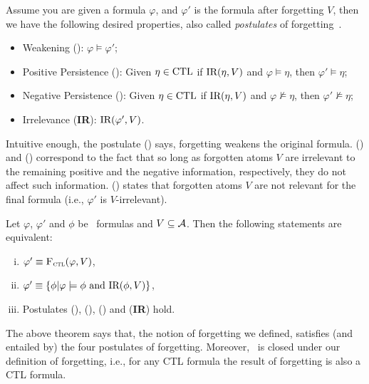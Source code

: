 \documentclass[letterpaper]{article} %
\begin{document}


Assume you are given a formula $\varphi$, and $\varphi'$ is the formula after forgetting $V$, then we have the following desired properties, also called {\em postulates} of forgetting~\cite{Yan:AIJ:2009}.
\begin{itemize}
  \item Weakening (\W): $\varphi \models \varphi'$;
  \item Positive Persistence (\PP):
  Given $\eta \in \textrm{CTL}$ if $\textrm{IR}(\eta, V)$ and $\varphi \models \eta$, then $\varphi' \models \eta$;
  \item Negative Persistence (\NgP):   Given $\eta \in \textrm{CTL}$  if $\textrm{IR}(\eta, V)$ and $\varphi \nvDash \eta$, then $\varphi' \nvDash \eta$;
  \item Irrelevance (\textbf{IR}): $\textrm{IR}(\varphi', V)$.
\end{itemize}


Intuitive enough, the postulate (\W) says, forgetting weakens the original formula.  (\PP)  and  (\NgP) correspond to the fact that so long as forgotten atoms $V$ are irrelevant to the remaining positive and the negative information, respectively, they do not affect such information. (\textbf{\IR}) states that forgotten atoms $V$ are not relevant for the final formula (i.e., $\varphi'$ is $V$-irrelevant).



\begin{theorem}\label{thm:close}
Let $\varphi$, $\varphi'$ and $\phi$ be \CTL\ formulas and $V \subseteq {\cal A}$.
Then the following statements are equivalent:
\begin{enumerate}[(i)]
  \item $\varphi' \equiv {\textsc{F}_{\textsc{ctl}}}(\varphi, V)$,
  \item $\varphi'\equiv \{\phi | \varphi \models \phi \text{ and } \textrm{IR}(\phi, V)\}$,
  \item Postulates (\W), (\PP), (\NgP) and (\textbf{IR}) hold.
\end{enumerate}
\end{theorem}
The above theorem says that, the notion of forgetting  we defined, satisfies (and entailed by) the  four postulates of forgetting. Moreover, \CTL\ is closed under our definition of forgetting, i.e.,  for any CTL formula the result of forgetting is also a CTL formula.
\end{document}
